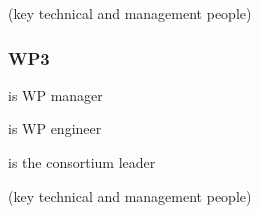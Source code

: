 


 (key technical and management people)


\subsubsection{WP3}

 is WP manager

 is WP engineer

 is the consortium leader

 (key technical and management people)



